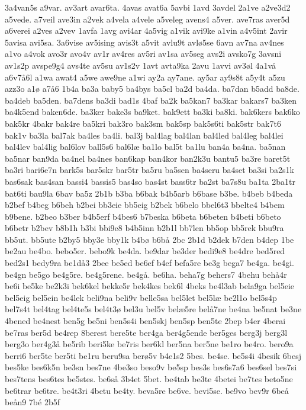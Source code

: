 {3a4van5s
a9var.
av3art
avar6ta.
4avas
avat6a
5avbi
1avd
3avdel
2a1ve
a2ve3d2
a5vede.
a7veil
ave3in
a2vek
a4vela
a4vele
a5veleg
avens4
a5ver.
ave7ras
aver5d
a6verei
a2ves
a2vev
1avfa
1avg
avi4ar
4a5vig
a1vik
avi9ke
a1vin
a4v5int
2avir
5avisa
avi5sa.
3a6vise
av5ising
avis3t
a5vit
avlu9t
avlø5se
6avn
av7na
av4nes
a1vo
a4vok
avo3r
avo4v
av1r
av4res
av5ri
av1sa
av5seg
avs2i
avsko7g
3avsni
av1s2p
avspe9g4
avs4te
av5su
av1s2v
1avt
avta9ka
2avu
1avvi
av3øl
4a1vå
a6v7å6l
a1wa
awat4
a5we
awe9ne
a1wi
ay2a
ay7ane.
ay5ar
ay9s8t
a5y4t
a5zu
azz3o
a1ø
a7å6
1b4a
ba3a
baby5
ba4bys
ba5cl
ba2d
ba4da.
ba7dan
b5add
ba8de.
ba4deb
ba5den.
ba7dens
ba3di
bad1s
4baf
ba2k
ba5kan7
ba3kar
bakars7
ba3ken
ba4k5end
baken6de.
ba3ker
bake3s
ba9ket.
bak9ett
ba3ki
ba8ki.
bak6kers
bak6ko
bak5kr
4bakr
bak4re
ba5kri
bak3ro
bak3sm
bak5sp
bak5s6ti
bak5str
bak7t6
bak1v
ba3la
bal7ak
ba4les
ba4li.
bal3j
bal4lag
bal4lan
bal4led
bal4leg
bal4lei
bal4lev
bal4lig
bal6lov
ball5s6
bal6læ
ba1lo
bal5t
ba1lu
ban4a
ba4na.
ba5nan
ba5nar
ban9da
ba4nel
ba4nes
ban6kap
ban4kor
ban2k3u
bantu5
ba3re
baret5t
ba3ri
bari6e7n
bark5s
bar5skr
bar5tr
ba5ru
ba5sen
ba4seru
ba4set
ba3si
ba2s1k
bas6sak
bas4san
bassi4
bassis5
bas4so
bas4st
bass6tr
ba2st
ba7s8u
ba1ta
2ba1tr
bat6ti
bau9la
6bav
ba5z
2b1b
b3ba
b6bak
b4b5arb
b6base
b3be.
b4beb
b4beda
b2bef
b4beg
b6beh
b2bei
bb3eie
bb5eig
b2bek
b6belo
bbel6t3
bbelte4
b4bem
b9bene.
b2beo
b3ber
b4b5erf
b4bes6
b7beska
b6beta
b6beten
b4beti
b6beto
b6betr
b2bev
b8b1h
b3bi
bbi9e8
b4b5inn
b2b1l
bb7len
bb5op
bb5rek
bbu9ra
bb5ut.
bb5ute
b2by5
bby3e
bby1k
b4bø
b6bå
2bc
2b1d
b2dek
b7den
b4dep
1be
be2au
be4bo.
bebo5er.
bebo9k
be4da.
be9dar
be3der
bedi9e8
be4dre
bed5red
bed2s1
bedy9ra
be1då3
2bee
be5ed
be6ef
b4ef
befa5re
be3g
bega7
be4ga.
be4gi.
be4gn
be5go
be4g5re.
be4g5rene.
be4gå.
be6ha.
beha7g
behers7
4behu
behå4r
be6i
be5ke
be2k3i
bek6kel
bekke5r
bek4kes
bek6l
4beks
be4l3ab
bela9ga
bel5eie
bel5eig
bel5ein
be4lek
beli9na
beli9v
belle5sa
bel5let
bel5læ
be2l1o
bel5s4p
bel7s4t
bel4tag
bel4te5s
bel4t3ø
bel3u
bel5v
belæ5re
belå7ne
be4na
be5nat
be3ne
4bened
be4nest
ben5g
be5ni
ben5s4i
ben5skj
ben5sp
ben5te
2bep
b4er
4berai
be7ras
ber5d
be4rep
8berest
bere5te
ber4ga
ber4g5ende
ber5ges
berg3j
berg3l
berg3o
ber4g3å
be5rib
beri5ke
be7ris
ber6kl
ber5na
ber5ne
be1ro
be4ro.
bero9a
berri6
ber5te
ber5ti
be1ru
beru9sa
berø5v
b4e1s2
5bes.
be4se.
be5s4i
4besik
6besj
bes5ke
bes6k5n
be3sn
bes7ne
4be3so
beso9v
be5sp
bes3s
bes6s7a6
bes6sel
bes7si
bes7tens
bes6tes
be5stes.
be6så
3b4et
5bet.
be4tab
be3te
4betei
be7tes
beto5ne
be6trar
be6tre.
be4t3ri
4betu
be4ty.
beva5re
be6ve.
bevi5se.
be9vo
bev9r
6beå
beån9
7bé
2b5f
}
